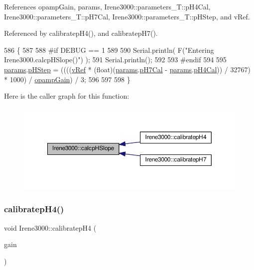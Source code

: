 References opamp\+Gain, params, Irene3000\+::parameters\+\_\+\+T\+::p\+H4\+Cal, Irene3000\+::parameters\+\_\+\+T\+::p\+H7\+Cal, Irene3000\+::parameters\+\_\+\+T\+::p\+H\+Step, and v\+Ref.



Referenced by calibratep\+H4(), and calibratep\+H7().


\begin{DoxyCode}
586 \{
587 
588 \textcolor{preprocessor}{#if DEBUG == 1 }
589 
590     Serial.println( F(\textcolor{stringliteral}{"Entering Irene3000.calcpHSlope()"}) );
591     Serial.println();
592 
593 \textcolor{preprocessor}{#endif }
594 
595     \hyperlink{classIrene3000_a136585a5ee7f9ac6ab52175fa153f8e3}{params}.\hyperlink{structIrene3000_1_1parameters__T_a61cfcc2539d5f630e9071f3753aba9fe}{pHStep} = ((((\hyperlink{classIrene3000_a018e7ff9bee57e6d2b298667a668ba7e}{vRef} * (float)(\hyperlink{classIrene3000_a136585a5ee7f9ac6ab52175fa153f8e3}{params}.\hyperlink{structIrene3000_1_1parameters__T_a21265466a570d84bff914f26d2f7a03e}{pH7Cal} - 
      \hyperlink{classIrene3000_a136585a5ee7f9ac6ab52175fa153f8e3}{params}.\hyperlink{structIrene3000_1_1parameters__T_a1144de6fb54eb3e1dd2a3d8c2afc97dc}{pH4Cal})) / 32767) * 1000) / \hyperlink{classIrene3000_a4e588985ca74e5076029d5dee81034f2}{opampGain}) / 3;
596 
597  
598 \}
\end{DoxyCode}
Here is the caller graph for this function\+:\nopagebreak
\begin{figure}[H]
\begin{center}
\leavevmode
\includegraphics[width=350pt]{classIrene3000_a81f6a79e546679692053f7ac1af49613_icgraph}
\end{center}
\end{figure}
\mbox{\label{classIrene3000_a9772eeea2305fad6236a82e33e93892e}} 
\subsubsection{\texorpdfstring{calibratep\+H4()}{calibratepH4()}}
{\footnotesize\ttfamily void Irene3000\+::calibratep\+H4 (\begin{DoxyParamCaption}\item[{ads\+Gain\+\_\+t}]{gain }\end{DoxyParamCaption})}

